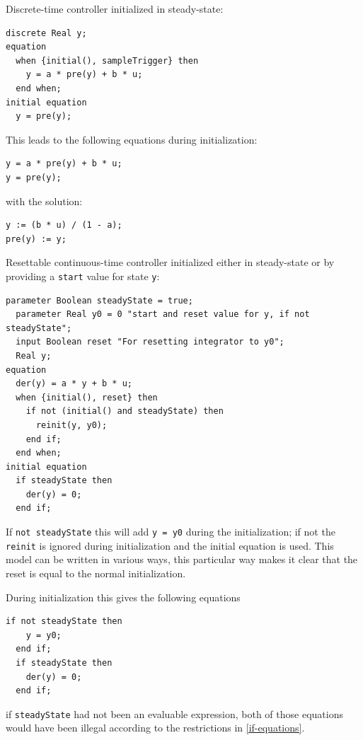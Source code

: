 \begin{example}
Discrete-time controller initialized in steady-state:
\begin{lstlisting}[language=modelica]
  discrete Real y;
equation
  when {initial(), sampleTrigger} then
    y = a * pre(y) + b * u;
  end when;
initial equation
  y = pre(y);
\end{lstlisting}

This leads to the following equations during initialization:
\begin{lstlisting}[language=modelica]
y = a * pre(y) + b * u;
y = pre(y);
\end{lstlisting}
with the solution:
\begin{lstlisting}[language=modelica]
y := (b * u) / (1 - a);
pre(y) := y;
\end{lstlisting}
\end{example}

\begin{example}
Resettable continuous-time controller initialized either in steady-state or by providing a \lstinline!start! value for state \lstinline!y!:
\begin{lstlisting}[language=modelica]
  parameter Boolean steadyState = true;
  parameter Real y0 = 0 "start and reset value for y, if not steadyState";
  input Boolean reset "For resetting integrator to y0";
  Real y;
equation
  der(y) = a * y + b * u;
  when {initial(), reset} then
    if not (initial() and steadyState) then
      reinit(y, y0);
    end if;
  end when;
initial equation
  if steadyState then
    der(y) = 0;
  end if;
\end{lstlisting}
If \lstinline!not steadyState! this will add \lstinline!y = y0! during the initialization; if not the \lstinline!reinit! is ignored during initialization and the initial equation is used.
This model can be written in various ways, this particular way makes it clear that the reset is equal to the normal initialization.

During initialization this gives the following equations
\begin{lstlisting}[language=modelica]
  if not steadyState then
    y = y0;
  end if;
  if steadyState then
    der(y) = 0;
  end if;
\end{lstlisting}
if \lstinline!steadyState! had not been an evaluable expression, both of those equations would have been illegal according to the restrictions in \cref{if-equations}.
\end{example}

